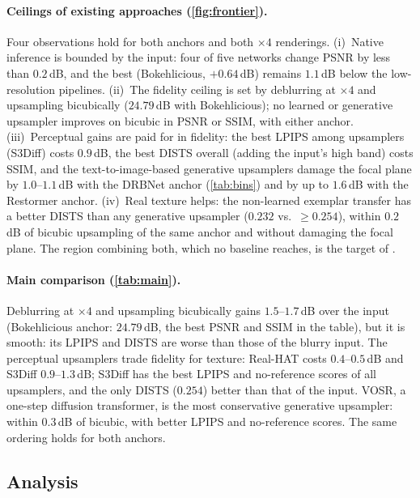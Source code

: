 \paragraph{Ceilings of existing approaches (\cref{fig:frontier}).} Four observations hold for both
anchors and both $\times4$ renderings. (i)~Native inference is bounded by the input: four of five
networks change PSNR by less than $0.2$\,dB, and the best (Bokehlicious, $+0.64$\,dB) remains
$1.1$\,dB below the low-resolution pipelines. (ii)~The fidelity ceiling is set by deblurring at
$\times4$ and upsampling bicubically ($24.79$\,dB with Bokehlicious); no learned or generative
upsampler improves on bicubic in PSNR or SSIM, with either anchor. (iii)~Perceptual gains are paid
for in fidelity: the best LPIPS among upsamplers (S3Diff) costs $0.9$\,dB, the best DISTS overall
(adding the input's high band) costs SSIM, and the text-to-image-based generative upsamplers damage the
focal plane by $1.0$--$1.1$\,dB with the DRBNet anchor (\cref{tab:bins}) and by up to $1.6$\,dB with
the Restormer anchor. (iv)~Real texture helps: the non-learned exemplar transfer has a
better DISTS than any generative upsampler ($0.232$ vs.\ $\geq0.254$), within $0.2$\,dB of bicubic
upsampling of the same anchor and without damaging the focal plane. The region combining both, which no baseline reaches, is the target of
\method.

\paragraph{Main comparison (\cref{tab:main}).} Deblurring at $\times4$ and upsampling bicubically
gains $1.5$--$1.7$\,dB over the input (Bokehlicious anchor: $24.79$\,dB, the best PSNR and SSIM in the
table), but it is smooth: its LPIPS and DISTS are worse than those of the blurry input. The perceptual
upsamplers trade fidelity for texture: Real-HAT costs $0.4$--$0.5$\,dB and S3Diff $0.9$--$1.3$\,dB; S3Diff
has the best LPIPS and no-reference scores of all upsamplers, and the only DISTS ($0.254$) better than
that of the input. VOSR, a one-step diffusion transformer, is the most conservative generative upsampler:
within $0.3$\,dB of bicubic, with better LPIPS and no-reference scores. The same ordering holds for both
anchors. 

\subsection{Analysis}
\label{sec:exp_analysis}

